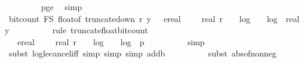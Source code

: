\begin{isabellebody}
\ \ \ \ \ \ \ \isamarkupfalse%
\ p{\isacharunderscore}{\kern0pt}ge{\isacharunderscore}{\kern0pt}{}\ \isamarkupfalse%
\ simp\isanewline
\isanewline
\ \ \ \ \ \ \isamarkupfalse%
\ {\isachardoublequoteopen}bit{\isacharunderscore}{\kern0pt}count\ {\isacharparenleft}{\kern0pt}F\isactrlsub S\ {\isacharparenleft}{\kern0pt}float{\isacharunderscore}{\kern0pt}of\ {\isacharparenleft}{\kern0pt}truncate{\isacharunderscore}{\kern0pt}down\ r\ y{\isacharparenright}{\kern0pt}{\isacharparenright}{\kern0pt}{\isacharparenright}{\kern0pt}\ {\isasymle}\ \ ereal\ {\isacharparenleft}{\kern0pt}{}\ {\isacharplus}{\kern0pt}\ {}\ {\isacharasterisk}{\kern0pt}\ real\ r\ {\isacharplus}{\kern0pt}\ {}\ {\isacharasterisk}{\kern0pt}\ log\ {}\ {\isacharparenleft}{\kern0pt}{}\ {\isacharplus}{\kern0pt}\ {\isasymbar}log\ {}\ {\isasymbar}real\ y{\isasymbar}{\isasymbar}{\isacharparenright}{\kern0pt}{\isacharparenright}{\kern0pt}{\isachardoublequoteclose}\isanewline
\ \ \ \ \ \ \ \ \isamarkupfalse%
\ {\isacharparenleft}{\kern0pt}rule\ truncate{\isacharunderscore}{\kern0pt}float{\isacharunderscore}{\kern0pt}bit{\isacharunderscore}{\kern0pt}count{\isacharparenright}{\kern0pt}\isanewline
\ \ \ \ \ \ \isamarkupfalse%
\ \isamarkupfalse%
\ {\isachardoublequoteopen}{\isachardot}{\kern0pt}{\isachardot}{\kern0pt}{\isachardot}{\kern0pt}\ {\isasymle}\ ereal\ {\isacharparenleft}{\kern0pt}{}\ {\isacharplus}{\kern0pt}\ {}\ {\isacharasterisk}{\kern0pt}\ real\ r\ {\isacharplus}{\kern0pt}\ {}\ {\isacharasterisk}{\kern0pt}\ log\ {}\ {\isacharparenleft}{\kern0pt}{}\ {\isacharplus}{\kern0pt}\ log\ {}\ p{\isacharparenright}{\kern0pt}{\isacharparenright}{\kern0pt}{\isachardoublequoteclose}\isanewline
\ \ \ \ \ \ \ \ \isamarkupfalse%
\ {\isacharparenleft}{\kern0pt}simp{\isacharparenright}{\kern0pt}\isanewline
\ \ \ \ \ \ \ \ \isamarkupfalse%
\ {\isacharparenleft}{\kern0pt}subst\ log{\isacharunderscore}{\kern0pt}le{\isacharunderscore}{\kern0pt}cancel{\isacharunderscore}{\kern0pt}iff{\isacharcomma}{\kern0pt}\ simp{\isacharcomma}{\kern0pt}\ simp{\isacharcomma}{\kern0pt}\ simp\ add{\isacharcolon}{\kern0pt}b{\isacharunderscore}{\kern0pt}{}{\isacharunderscore}{\kern0pt}{}{}{\isacharparenright}{\kern0pt}\isanewline
\ \ \ \ \ \ \ \ \isamarkupfalse%
\ {\isacharparenleft}{\kern0pt}subst\ abs{\isacharunderscore}{\kern0pt}of{\isacharunderscore}{\kern0pt}nonneg{\isacharparenright}{\kern0pt}\ \isamarkupfalse%

\end{isabellebody}
